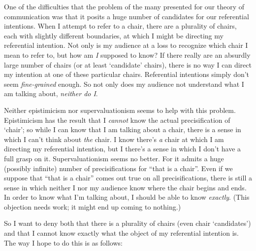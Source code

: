 \documentclass[11pt]{article}
\begin{document}
\begin{spacing}{1.5}
One of the difficulties that the problem of the many presented for our
theory of communication was that it posits a huge number of candidates
for our referential intentions.  When I attempt to refer to a chair,
there are a plurality of chairs, each with slightly different
boundaries, at which I might be directing my referential intention.
Not only is my audience at a loss to recognize which chair I mean to
refer to, but how am {\em I} supposed to know?  If there really are an
absurdly large number of chairs (or at least `candidate' chairs),
there is no way I can direct my intention at one of these particular
chairs.  Referential intentions simply don't seem {\em fine-grained}
enough.  So not only does my audience not understand what I am talking
about, {\em neither do I}.

Neither epistimicism nor supervaluationism seems to help with this
problem.  Epistimicism has the result that I {\em cannot} know the
actual precisification of `chair'; so while I can know that I am
talking about a chair, there is a sense in which I can't think about
{\em the} chair.  I know there's {\em a} chair at which I am directing
my referential intention, but I there's a sense in which I don't have
a full grasp on it.  Supervaluationism seems no better.  For it admits
a huge (possibly infinite) number of precisifications for ``that is a
chair''.  Even if we suppose that ``that is a chair'' comes out true
on all precisifications, there is still a sense in which neither I nor
my audience know where the chair begins and ends.  In order to know
what I'm talking about, I should be able to know {\em exactly}.  (This
objection needs work; it might end up coming to nothing.)

So I want to deny both that there is a plurality of chairs (even chair
`candidates') and that I cannot know exactly what the object of my
referential intention is.  The way I hope to do this is as follows:


\end{spacing}
\end{document}
